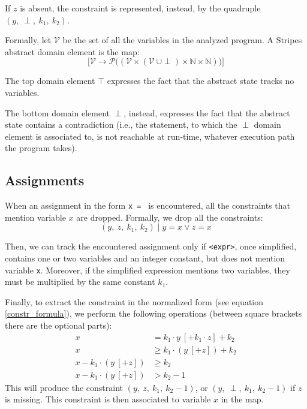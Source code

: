 \documentclass{article}
\newcommand{\spc}{\:}
\begin{document}
If $z$ is absent, the constraint is represented, instead, by the quadruple $(y,\spc \perp,\spc k_1,\spc k_2)$. 

Formally, let $\mathcal{V}$ be the set of all the variables in the analyzed program. A Stripes abstract domain element is the map:
$$
\Big[\mathcal{V} \rightarrow \mathcal{P}\big((\mathcal{V} \times (\mathcal{V}\ \cup \perp) \times \mathbb{N} \times \mathbb{N})\big)\Big]
$$

The top domain element $\top$ expresses the fact that the abstract state tracks no variables.

The bottom domain element $\perp$, instead, expresses the fact that the abstract state contains a contradiction (i.e., the statement, to which the $\perp$ domain element is associated to, is not reachable at run-time, whatever execution path the program takes).

\subsection{Assignments}
\label{assignment_def}
When an assignment in the form \texttt{x = } is encountered, all the constraints that mention variable $x$ are dropped. Formally, we drop all the constraints:
$$
(y,\spc z,\spc k_1,\spc k_2) \mid y = x \vee z = x
$$

Then, we can track the encountered assignment only if \texttt{<expr>}, once simplified, contains one or two variables and an integer constant, but does not mention variable \texttt{x}.
Moreover, if the simplified expression mentions two variables, they must be multiplied by the same constant $k_1$.

Finally, to extract the constraint in the normalized form (see equation \ref{constr_formula}), we perform the following operations (between square brackets there are the optional parts):
\begin{align*}
    x &= k_1 \cdot y\ [+ k_1 \cdot z] + k_2\\
    x &\geq k_1 \cdot (y\ [+ z]) + k_2\\
    x - k_1 \cdot (y\ [+ z]) &\geq k_2\\
    x - k_1 \cdot (y\ [+ z]) &> k_2 - 1
\end{align*}
\noindent
This will produce the constraint $(y,\spc z,\spc k_1,\spc k_2 - 1)$, or $(y,\spc \perp,\spc k_1,\spc k_2 - 1)$ if $z$ is missing.
This constraint is then associated to variable $x$ in the map.
\end{document}
